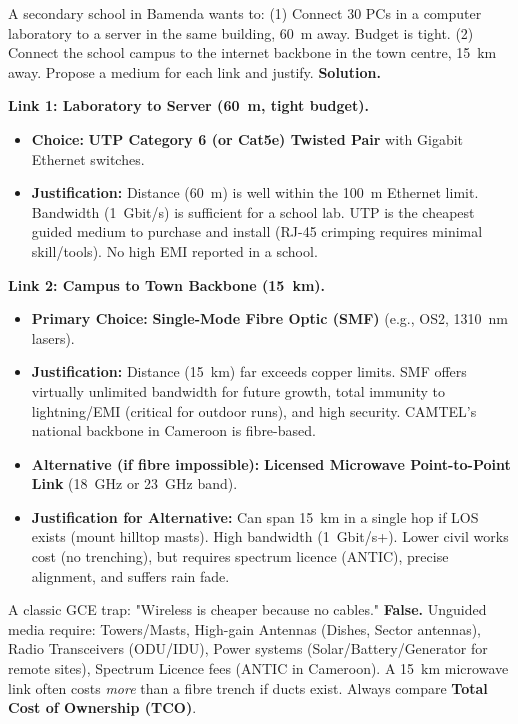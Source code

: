\documentclass[11pt]{article}
\begin{document}
\begin{exoresolu}
A secondary school in Bamenda wants to: (1) Connect 30 PCs in a computer laboratory to a server in the same building, \SI{60}{m} away. Budget is tight. (2) Connect the school campus to the internet backbone in the town centre, \SI{15}{km} away. Propose a medium for each link and justify.
\tcblower
\textbf{Solution.}

\textbf{Link 1: Laboratory to Server (\SI{60}{m}, tight budget).}
\begin{itemize}
\item \textbf{Choice:} \textbf{UTP Category 6 (or Cat5e) Twisted Pair} with Gigabit Ethernet switches.
\item \textbf{Justification:} Distance (\SI{60}{m}) is well within the \SI{100}{m} Ethernet limit. Bandwidth (\SI{1}{Gbit/s}) is sufficient for a school lab. UTP is the cheapest guided medium to purchase and install (RJ-45 crimping requires minimal skill/tools). No high EMI reported in a school.
\end{itemize}

\textbf{Link 2: Campus to Town Backbone (\SI{15}{km}).}
\begin{itemize}
\item \textbf{Primary Choice:} \textbf{Single-Mode Fibre Optic (SMF)} (e.g., OS2, \SI{1310}{nm} lasers).
\item \textbf{Justification:} Distance (\SI{15}{km}) far exceeds copper limits. SMF offers virtually unlimited bandwidth for future growth, total immunity to lightning/EMI (critical for outdoor runs), and high security. CAMTEL's national backbone in Cameroon is fibre-based.
\item \textbf{Alternative (if fibre impossible):} \textbf{Licensed Microwave Point-to-Point Link} (\SI{18}{GHz} or \SI{23}{GHz} band).
\item \textbf{Justification for Alternative:} Can span \SI{15}{km} in a single hop if LOS exists (mount hilltop masts). High bandwidth (\SI{1}{Gbit/s}+). Lower civil works cost (no trenching), but requires spectrum licence (ANTIC), precise alignment, and suffers rain fade.
\end{itemize}
\end{exoresolu}

\begin{attention}
A classic GCE trap: "Wireless is cheaper because no cables." \textbf{False.} Unguided media require: Towers/Masts, High-gain Antennas (Dishes, Sector antennas), Radio Transceivers (ODU/IDU), Power systems (Solar/Battery/Generator for remote sites), Spectrum Licence fees (ANTIC in Cameroon). A \SI{15}{km} microwave link often costs \emph{more} than a fibre trench if ducts exist. Always compare \textbf{Total Cost of Ownership (TCO)}.
\end{attention}
\end{document}
